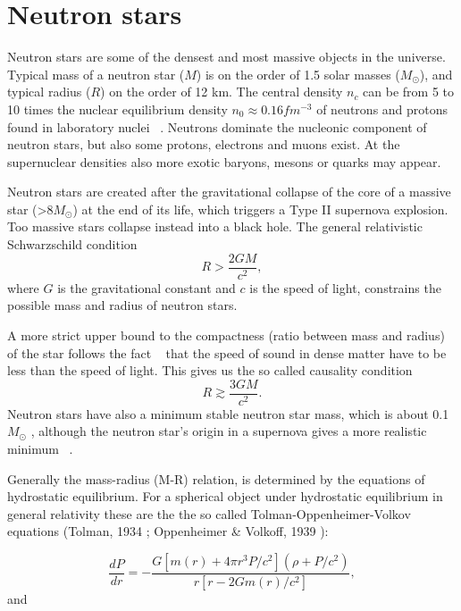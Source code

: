 \documentclass{wihuri}
\begin{document}
\section{Neutron stars}


Neutron stars are some of the densest and most massive objects in the
universe. Typical mass of a neutron star ($M$) is on the order of 1.5 solar masses ($M_{\odot}$), and typical radius ($R$) on the order of 12 km. The central density $n_{c}$ can be from 5 to 10 times the nuclear equilibrium density $n_{0} \approx 0.16 fm^{-3}$ of neutrons and protons found in laboratory nuclei ~\cite{lattimer}. Neutrons dominate the nucleonic component of neutron stars, but also some protons, electrons and muons exist. At the supernuclear densities also more exotic baryons, mesons or quarks may appear.

 
Neutron stars are created after the gravitational collapse of the core of a
massive star (>8$M_{\odot}$) at the end of its life, which triggers a Type II supernova explosion. Too massive stars collapse instead into a black hole. The general relativistic Schwarzschild condition 
\begin{equation}
 R > \frac{2GM}{c^{2}},
 \end{equation} 
where $G$ is the gravitational constant and $c$ is the speed of light, constrains the possible mass and radius of neutron stars.

A more strict upper bound to the compactness (ratio between mass and radius) of the star follows
the fact ~\cite{rhoades} %
that the speed of sound in dense matter have to be less than the speed of light. This gives us the so called causality condition
\begin{equation}
 R \gtrsim \frac{3GM}{c^{2}}.
 \end{equation} 
Neutron stars have also a minimum stable neutron star mass, which is about 0.1 $M_{\odot}$ , although the neutron star’s origin in a supernova gives a more realistic minimum ~\cite{lattimer}.



Generally the mass-radius (M-R) relation, is determined by the equations of hydrostatic equilibrium. For a spherical object under hydrostatic equilibrium in general relativity these are the the so called Tolman-Oppenheimer-Volkov equations (Tolman,
1934 \cite{tolman}; Oppenheimer \& Volkoff, 1939 \cite{oppenheimer}):


\begin{equation}
 \frac{dP}{dr} = -\frac{G[m(r)+4 \pi r^{3}P/c^{2}](\rho + P/c^{2})}{r[r-2Gm(r)/c^{2}]},
 \end{equation} 
and
\end{document}
